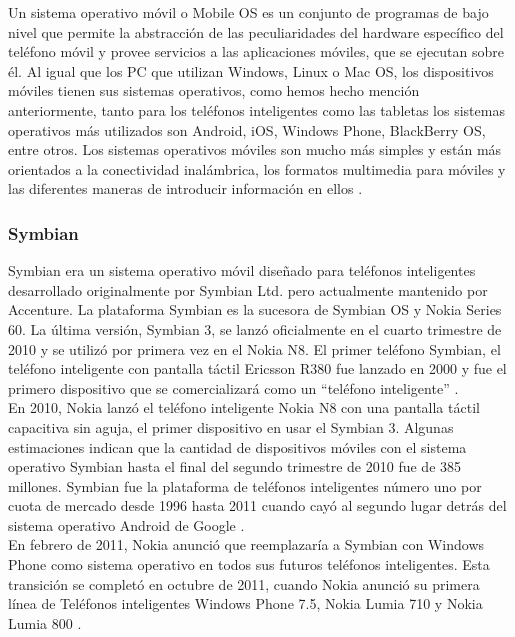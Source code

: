 Un sistema operativo móvil o Mobile OS es un conjunto de programas de bajo nivel que permite la abstracción de las peculiaridades del hardware específico del teléfono móvil y provee servicios a las aplicaciones móviles, que se ejecutan sobre él. Al igual que los PC que utilizan Windows, Linux o Mac OS, los dispositivos móviles tienen sus sistemas operativos, como hemos hecho mención anteriormente, tanto para los teléfonos inteligentes como las tabletas los sistemas operativos más utilizados son Android, iOS, Windows Phone, BlackBerry OS, entre otros. Los sistemas operativos móviles son mucho más simples y están más orientados a la conectividad inalámbrica, los formatos multimedia para móviles y las diferentes maneras de introducir información en ellos  \cite{MBOS}. \\

\subsubsection{Symbian}

Symbian era un sistema operativo móvil diseñado para teléfonos inteligentes desarrollado originalmente por Symbian Ltd. pero actualmente mantenido por Accenture. La plataforma Symbian es la sucesora de Symbian OS y Nokia Series 60.  La última versión, Symbian 3, se lanzó oficialmente en el cuarto trimestre de 2010 y se utilizó por primera vez en el Nokia N8. El primer teléfono Symbian, el teléfono inteligente con pantalla táctil Ericsson R380 fue lanzado en 2000 y fue el primero dispositivo que se comercializará como un “teléfono inteligente” \cite{MBPDO}. \\

En 2010, Nokia lanzó el teléfono inteligente Nokia N8 con una pantalla táctil capacitiva sin aguja, el primer dispositivo en usar el Symbian 3. Algunas estimaciones indican que la cantidad de dispositivos móviles con el sistema operativo Symbian hasta el final del segundo trimestre de 2010 fue de 385 millones. Symbian fue la plataforma de teléfonos inteligentes número uno por cuota de mercado desde 1996 hasta 2011 cuando 
cayó al segundo lugar detrás del sistema operativo Android de Google \cite{MBPDO}. \\

En febrero de 2011, Nokia anunció que reemplazaría a Symbian con Windows Phone como sistema operativo en todos sus futuros teléfonos inteligentes. Esta transición se completó en octubre de 2011, cuando Nokia anunció su primera línea de Teléfonos inteligentes Windows Phone 7.5, Nokia Lumia 710 y Nokia Lumia 800 \cite{MBPDO}. \\

